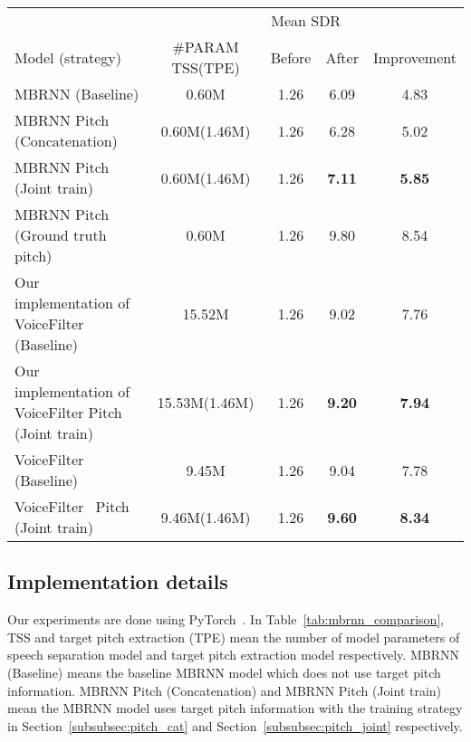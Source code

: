 \begin{table*}[!htbp]
    \small
    \centering
    \begin{tabular}{l|c|c|c|c}
        \toprule
        & \multicolumn{4}{c}{Mean SDR} \\
        Model (strategy)                             & \#PARAM TSS(TPE) & Before & After         & Improvement   \\
        \midrule
        MBRNN (Baseline)                             & 0.60M            & 1.26   & 6.09          & 4.83          \\
        MBRNN Pitch (Concatenation)                  & 0.60M(1.46M)     & 1.26   & 6.28          & 5.02          \\
        MBRNN Pitch (Joint train)                    & 0.60M(1.46M)     & 1.26   & \textbf{7.11} & \textbf{5.85} \\
        MBRNN Pitch (Ground truth pitch)             & 0.60M            & 1.26   & 9.80          & 8.54          \\
        \midrule
        Our implementation of VoiceFilter (Baseline) & 15.52M           & 1.26   & 9.02          & 7.76          \\
        Our implementation of VoiceFilter Pitch (Joint train) & 15.53M(1.46M) & 1.26 & \textbf{9.20}
        & \textbf{7.94}
        \\
        \midrule
        VoiceFilter~\cite{voicefilter} (Baseline)    & 9.45M            & 1.26   & 9.04          & 7.78          \\
        VoiceFilter~\cite{voicefilter} Pitch (Joint train) & 9.46M(1.46M) & 1.26 & \textbf{9.60}
        & \textbf{8.34}
        \\
        \bottomrule
    \end{tabular}
    \caption{Results comparison between different training strategies and the baseline with MBRNN and VoiceFilter model. ``Before" means the SDR value of the mixed utterance, ``After" means the SDR value of the estimated speech.}
    \label{tab:mbrnn_comparison}
\end{table*}

\subsection{Implementation details}
\label{subsec:implement}

Our experiments are done using PyTorch~\cite{NEURIPS2019_bdbca288}.
In Table~\ref{tab:mbrnn_comparison}, TSS and target pitch extraction (TPE) mean the number of model parameters of speech separation model and target pitch extraction model respectively.
MBRNN (Baseline) means the baseline MBRNN model which does not use target pitch information. MBRNN Pitch (Concatenation) and MBRNN Pitch (Joint train) mean the MBRNN model uses target pitch information with the training strategy in Section~\ref{subsubsec:pitch_cat} and Section~\ref{subsubsec:pitch_joint} respectively.


